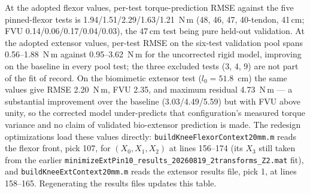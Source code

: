 At the adopted flexor values, per-test torque-prediction RMSE against the five pinned-flexor tests is 1.94/1.51/2.29/1.63/1.21~N{\,m} (48, 46, 47, 40-tendon, 41\,cm; FVU 0.14/0.06/0.17/0.04/0.03), the 47\,cm test being pure held-out validation. At the adopted extensor values, per-test RMSE on the six-test validation pool spans 0.56--1.88~N{\,m} against 0.95--3.62~N{\,m} for the uncorrected rigid model, improving on the baseline in every pool test; the three excluded tests (3, 4, 9) are not part of the fit of record. On the biomimetic extensor test ($l_{0} = 51.8$~cm) the same values give RMSE 2.20~N{\,m}, FVU 2.35, and maximum residual 4.73~N{\,m} --- a substantial improvement over the baseline (3.03/4.49/5.59) but with FVU above unity, so the corrected model under-predicts that configuration's measured torque variance and no claim of validated bio-extensor prediction is made. The redesign optimizations load these values directly: \texttt{buildKneeFlexorContext20mm.m} reads the flexor front, pick 107, for $(X_{0},X_{1},X_{2})$ at lines 156--174 (its $X_{3}$ still taken from the earlier \texttt{minimizeExtPin10\_results\_20260819\_2transforms\_Z2.mat} fit), and \texttt{buildKneeExtContext20mm.m} reads the extensor results file, pick 1, at lines 158--165. Regenerating the results files updates this table.
